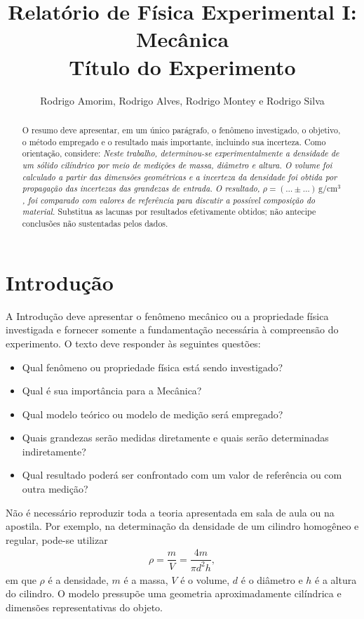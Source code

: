 \documentclass[aps,prb,12pt,onecolumn,amsmath,amssymb]{revtex4-2}
\begin{document}
\title{Relatório de Física Experimental I: Mecânica \\ \large Título do Experimento}

\author{Rodrigo Amorim, Rodrigo Alves, Rodrigo Montey e Rodrigo Silva}

\begin{abstract}
O resumo deve apresentar, em um único parágrafo, o fenômeno investigado, o objetivo, o método empregado e o resultado mais importante, incluindo sua incerteza. Como orientação, considere: \textit{Neste trabalho, determinou-se experimentalmente a densidade de um sólido cilíndrico por meio de medições de massa, diâmetro e altura. O volume foi calculado a partir das dimensões geométricas e a incerteza da densidade foi obtida por propagação das incertezas das grandezas de entrada. O resultado, $\rho=(\ldots\pm\ldots)\,\mathrm{g/cm^3}$, foi comparado com valores de referência para discutir a possível composição do material.} Substitua as lacunas por resultados efetivamente obtidos; não antecipe conclusões não sustentadas pelos dados.
\end{abstract}

\maketitle

\section{Introdução}
A Introdução deve apresentar o fenômeno mecânico ou a propriedade física investigada e fornecer somente a fundamentação necessária à compreensão do experimento. O texto deve responder às seguintes questões:
\begin{itemize}
    \item Qual fenômeno ou propriedade física está sendo investigado?
    \item Qual é sua importância para a Mecânica?
    \item Qual modelo teórico ou modelo de medição será empregado?
    \item Quais grandezas serão medidas diretamente e quais serão determinadas indiretamente?
    \item Qual resultado poderá ser confrontado com um valor de referência ou com outra medição?
\end{itemize}
Não é necessário reproduzir toda a teoria apresentada em sala de aula ou na apostila. Por exemplo, na determinação da densidade de um cilindro homogêneo e regular, pode-se utilizar
\begin{align}
    \rho = \dfrac{m}{V} = \dfrac{4m}{\pi d^2 h},
\end{align}
em que $\rho$ é a densidade, $m$ é a massa, $V$ é o volume, $d$ é o diâmetro e $h$ é a altura do cilindro. O modelo pressupõe uma geometria aproximadamente cilíndrica e dimensões representativas do objeto.
\end{document}
